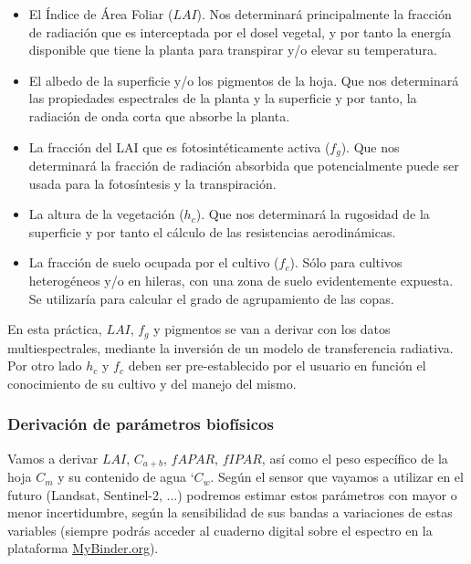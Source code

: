 \documentclass[a4paper,11pt]{article}
\begin{document}
    \begin{itemize}
      \item El Índice de Área Foliar ($LAI$). Nos determinará principalmente la fracción de radiación que es interceptada por el dosel vegetal, y por tanto la energía disponible que tiene la planta para transpirar y/o elevar su temperatura.
      
      \item El albedo de la superficie y/o los pigmentos de la hoja. Que nos determinará las propiedades espectrales de la planta y la superficie y por tanto, la radiación de onda corta que absorbe la planta.
      
      \item La fracción del LAI que es fotosintéticamente activa ($f_g$). Que nos determinará la fracción de radiación absorbida que potencialmente puede ser usada para la fotosíntesis y la transpiración.
      
      \item La altura de la vegetación ($h_c$). Que nos determinará la rugosidad de la superficie y por tanto el cálculo de las resistencias aerodinámicas.
      
      \item La fracción de suelo ocupada por el cultivo ($f_c$). Sólo para cultivos heterogéneos y/o en hileras, con una zona de suelo evidentemente expuesta. Se utilizaría para calcular el grado de agrupamiento de las copas.
    \end{itemize}

    En esta práctica, $LAI$, $f_g$ y pigmentos se van a derivar con los datos multiespectrales, mediante la inversión de un modelo de transferencia radiativa. Por otro lado $h_c$ y $f_c$ deben ser pre-establecido por el usuario en función el conocimiento de su cultivo y del manejo del mismo.

    \subsubsection{Derivación de parámetros biofísicos}
      Vamos a derivar $LAI$, $C_{a+b}$, $fAPAR$, $fIPAR$, así como el peso específico de la hoja $C_m$ y su contenido de agua `$C_w$. Según el sensor que vayamos a utilizar en el futuro (Landsat, Sentinel-2, ...) podremos estimar estos parámetros con mayor o menor incertidumbre, según la sensibilidad de sus bandas a variaciones de estas variables (siempre podrás acceder al cuaderno digital sobre el espectro en la plataforma \href{https://mybinder.org/v2/gh/hectornieto/Curso-WUE/HEAD}{MyBinder.org}).
      
\end{document}
